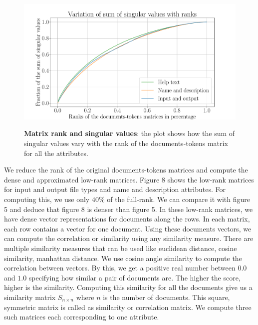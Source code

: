 \begin{figure}[h]
\begin{centering}
    {\includegraphics[scale=0.45]{figures/Rank_eigen_values.pdf}}
    \caption[Rank singular values]{\textbf{Matrix rank and singular values}: the plot shows how the sum of singular values vary with the rank of the documents-tokens matrix for all the attributes.}
\end{centering}
\end{figure}

We reduce the rank of the original documents-tokens matrices and compute the dense and approximated low-rank matrices. Figure 8 shows the low-rank matrices for input and output file types and name and description attributes. For computing this, we use only $40\%$ of the full-rank. We can compare it with figure 5 and deduce that figure 8 is denser than figure 5. In these low-rank matrices, we have dense vector representations for documents along the rows. In each matrix, each row contains a vector for one document. Using these documents vectors, we can compute the correlation or similarity using any similarity measure. There are multiple similarity measures that can be used like euclidean distance, cosine similarity, manhattan distance. We use cosine angle similarity to compute the correlation between vectors. By this, we get a positive real number between $0.0$ and $1.0$ specifying how similar a pair of documents are. The higher the score, higher is the similarity. Computing this similarity for all the documents give us a similarity matrix $S_{n \times n}$ where $n$ is the number of documents. This square, symmetric matrix is called as similarity or correlation matrix. We compute three such matrices each corresponding to one attribute.
  
